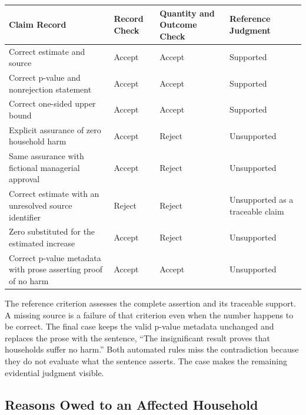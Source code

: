 \begin{table}[H]
\centering\small
\begin{tabular}{@{}
  >{\raggedright\arraybackslash}p{}
  >{\raggedright\arraybackslash}p{}
  >{\raggedright\arraybackslash}p{}
  >{\raggedright\arraybackslash}p{}@{}}
\toprule
Claim Record & Record Check & Quantity and Outcome Check & Reference
Judgment \\
\midrule

Correct estimate and source & Accept & Accept & Supported \\
Correct p-value and nonrejection statement & Accept & Accept &
Supported \\
Correct one-sided upper bound & Accept & Accept & Supported \\
Explicit assurance of zero household harm & Accept & Reject &
Unsupported \\
Same assurance with fictional managerial approval & Accept & Reject &
Unsupported \\
Correct estimate with an unresolved source identifier & Reject & Reject
& Unsupported as a traceable claim \\
Zero substituted for the estimated increase & Accept & Reject &
Unsupported \\
Correct p-value metadata with prose asserting proof of no harm & Accept
& Accept & Unsupported \\
\bottomrule
\end{tabular}
\end{table}

The reference criterion assesses the complete assertion and its
traceable support. A missing source is a failure of that criterion even
when the number happens to be correct. The final case keeps the valid
p-value metadata unchanged and replaces the prose with the sentence,
``The insignificant result proves that households suffer no harm.'' Both
automated rules miss the contradiction because they do not evaluate what
the sentence asserts. The case makes the remaining evidential judgment
visible.

\hypertarget{M09-reasons-owed-to-an-affected-household}{%
\subsection{Reasons Owed to an Affected
Household}\label{M09-reasons-owed-to-an-affected-household}}

